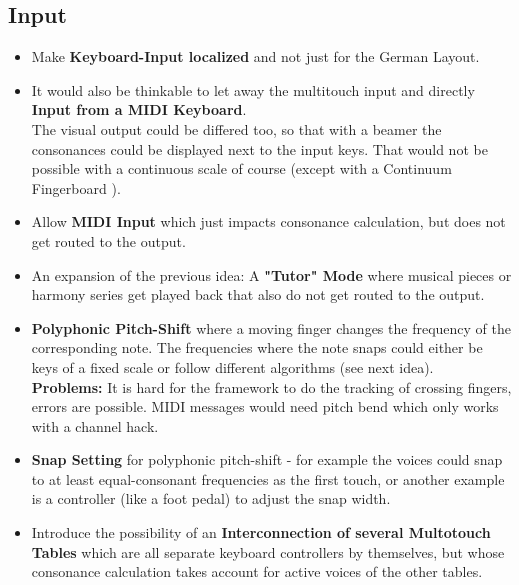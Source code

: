 \documentclass[12pt,a4paper,titlepage,oneside]{report}
\begin{document}
\subsection{Input}

\begin{itemize}

	\item Make \textbf{Keyboard-Input localized} and not just for the German Layout.

	\item It would also be thinkable to let away the multitouch input and directly \textbf{Input from a MIDI Keyboard}. \\
	The visual output could be differed too, so that with a beamer the consonances could be displayed next to the input keys. That would not be possible with a continuous scale of course (except with a Continuum Fingerboard \cite{bib:continuum}).

	\item Allow \textbf{MIDI Input} which just impacts consonance calculation, but does not get routed to the output.

	\item An expansion of the previous idea: A \textbf{"Tutor" Mode} where musical pieces or harmony series get played back that also do not get routed to the output.

	\item \textbf{Polyphonic Pitch-Shift} where a moving finger changes the frequency of the corresponding note. The frequencies where the note snaps could either be keys of a fixed scale or follow different algorithms (see next idea). \\
	\textbf{Problems:} It is hard for the framework to do the tracking of crossing fingers, errors are possible. MIDI messages would need pitch bend which only works with a channel hack.

	\item \textbf{Snap Setting} for polyphonic pitch-shift - for example the voices could snap to at least equal-consonant frequencies as the first touch, or another example is a controller (like a foot pedal) to adjust the snap width.

	\item Introduce the possibility of an \textbf{Interconnection of several Multotouch Tables} which are all separate keyboard controllers by themselves, but whose consonance calculation takes account for active voices of the other tables.

\end{itemize}
\end{document}
